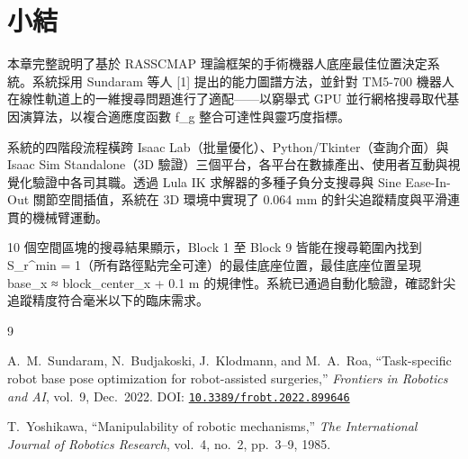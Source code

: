 \documentclass[a4paper, 12pt]{article}
\newcommand{\doi}[1]{DOI: \href{https://doi.org/#1}{\texttt{#1}}}
\begin{document}
\section{小結}
\label{sec:conclusion}

本章完整說明了基於 RASSCMAP 理論框架的手術機器人底座最佳位置決定系統。系統採用 Sundaram 等人 [1] 提出的能力圖譜方法，並針對 TM5-700 機器人在線性軌道上的一維搜尋問題進行了適配——以窮舉式 GPU 並行網格搜尋取代基因演算法，以複合適應度函數 f\_g 整合可達性與靈巧度指標。

系統的四階段流程橫跨 Isaac Lab（批量優化）、Python/Tkinter（查詢介面）與 Isaac Sim Standalone（3D 驗證）三個平台，各平台在數據產出、使用者互動與視覺化驗證中各司其職。透過 Lula IK 求解器的多種子負分支搜尋與 Sine Ease-In-Out 關節空間插值，系統在 3D 環境中實現了 0.064 mm 的針尖追蹤精度與平滑連貫的機械臂運動。

10 個空間區塊的搜尋結果顯示，Block 1 至 Block 9 皆能在搜尋範圍內找到 S\_r\^{}min = 1（所有路徑點完全可達）的最佳底座位置，最佳底座位置呈現 base\_x ≈ block\_center\_x + 0.1 m 的規律性。系統已通過自動化驗證，確認針尖追蹤精度符合毫米以下的臨床需求。

\begin{thebibliography}{9}

A.~M.~Sundaram, N.~Budjakoski, J.~Klodmann, and M.~A.~Roa,
``Task-specific robot base pose optimization for robot-assisted surgeries,''
\textit{Frontiers in Robotics and AI}, vol.~9, Dec.~2022.
\doi{10.3389/frobt.2022.899646}

T.~Yoshikawa,
``Manipulability of robotic mechanisms,''
\textit{The International Journal of Robotics Research}, vol.~4, no.~2, pp.~3--9, 1985.

\end{thebibliography}
\end{document}
